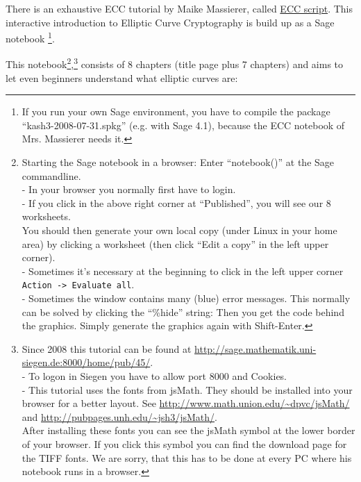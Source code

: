 There is an exhaustive ECC tutorial by Maike Massierer,
called \hyperlink{ec:Web-Link:Sage_Massierer}{ECC script}.
This interactive introduction to Elliptic Curve Cryptography is build up as
a Sage notebook%
\footnote{%
If you run your own Sage environment, you have to compile
the package ``kash3-2008-07-31.spkg'' (e.g. with Sage 4.1),
because the ECC notebook of Mrs. Massierer needs it.
}.

This notebook\footnote{%
Starting the Sage notebook in a browser: Enter ``notebook()'' at the Sage commandline.\\
- In your browser you normally first have to login.\\
- If you click in the above right corner at ``Published'', you will see our 8 worksheets.\\
You should then generate your own local copy (under Linux in your home area) by clicking
a worksheet (then click ``Edit a copy'' in the left upper corner).\\
- Sometimes it's necessary at the beginning to click in the left upper corner
  \verb#Action -> Evaluate all#.\\
- Sometimes the window contains many (blue) error messages. This normally can be
solved by clicking the ``\%hide'' string: Then you get the code behind the
graphics. Simply generate the graphics again with Shift-Enter.
},\footnote{%
  Since 2008 this tutorial can be found at
    \url{http://sage.mathematik.uni-siegen.de:8000/home/pub/45/}.\\
  - To logon in Siegen you have to allow port 8000 and Cookies.\\
  - This tutorial uses the fonts from jsMath. They should be installed into your browser
    for a better layout.
    See \url{http://www.math.union.edu/~dpvc/jsMath/}
    and \url{http://pubpages.unh.edu/~jsh3/jsMath/}.\\
    After installing these fonts you can see the jsMath symbol at the lower border
    of your browser. If you click this symbol you can find the download page for the TIFF fonts.
    We are sorry, that this has to be done at every PC where his notebook runs in a browser.
}
consists of 8 chapters (title page plus 7 chapters)
and aims to let even beginners understand what elliptic curves are:

